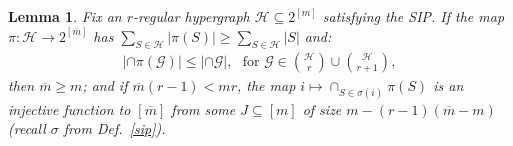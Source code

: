 \documentclass[journal, twocolumn]{IEEEtran}
\newtheorem{lemma}{Lemma}
\begin{document}
\begin{lemma}\label{NonEmptyLemma} 
Fix an $r$-regular hypergraph $\mathcal{H} \subseteq 2^{[m]}$ satisfying the SIP. If the map $\pi: \mathcal{H} \to 2^{[\overline m]}$ has $\sum_{S \in \mathcal{H}} |\pi(S)| \geq \sum_{S \in \mathcal{H}} |S|$ and:
\begin{align}\label{cond}
	|\cap \pi(\mathcal{G})| \leq |\cap \mathcal{G} |,\ \ \   \text{for } \mathcal{G} \in {\mathcal{H} \choose r} \cup {\mathcal{H} \choose r+1},
\end{align}
%
then $\overline m \geq m$; and if $\overline m  (r-1) < mr$, the map $i \mapsto \cap_{S \in \sigma(i)} \pi(S)$ is an injective function to $[\overline m]$ from some $J \subseteq [m]$ of size $m - (r-1)(\overline m - m)$ (recall $\sigma$ from Def.~\ref{sip}).  %
\end{lemma}
\end{document}
